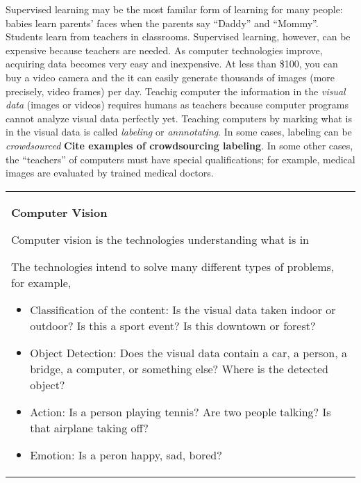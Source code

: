 Supervised learning may be the most familar form of learning for many
people: babies learn parents' faces when the parents say ``Daddy'' and
``Mommy''.  Students learn from teachers in classrooms.  Supervised
learning, however, can be expensive because teachers are needed.  As
computer technologies improve, acquiring data becomes very easy and
inexpensive.  At less than \$100, you can buy a video camera and the
it can easily generate thousands of images (more precisely, video
frames) per day. Teachig computer the information in the {\it visual
  data} (images or videos) requires humans as teachers because
computer programs cannot analyze visual data perfectly yet.  Teaching
computers by marking what is in the visual data is called {\it
  labeling} or {\it annnotating}.  In some cases, labeling can be {\it
  crowdsourced} {\bf Cite examples of crowdsourcing labeling}.
 In some other cases, the ``teachers'' of
computers must have special qualifications; for example, medical
images are evaluated by trained medical doctors.

\vspace{0.1in}
  \begin{tabular}{p{5in}}
\index{computer vision}
  \begin{center}
    {\bf Computer Vision}
  \end{center}

  Computer vision is the technologies understanding what is in

 The
technologies intend to solve many different types of problems, for
example,

\begin{itemize}
\item Classification of the content: Is the visual data taken indoor
  or outdoor?  Is this a sport event?  Is this downtown or forest?

\item Object Detection: Does the visual data contain a car, a person,
  a bridge, a computer, or something else?  Where is the detected
  object?

\item Action: Is a person playing tennis? Are two people talking?
  Is that airplane taking off?

\item Emotion: Is a peron happy, sad, bored?

\end{itemize}



  \end{tabular}
\vspace{0.1in}



